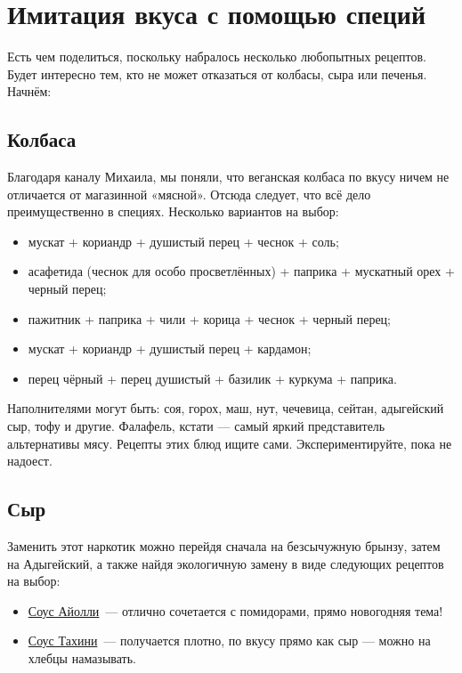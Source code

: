 \section{Имитация вкуса с помощью специй}

Есть чем поделиться, поскольку набралось несколько любопытных рецептов. Будет интересно тем, кто не может отказаться от колбасы, сыра или печенья. Начнём:

\subsection{Колбаса}

Благодаря каналу Михаила, мы поняли, что веганская колбаса по вкусу ничем не отличается от магазинной «мясной». Отсюда следует, что всё дело преимущественно в специях. Несколько вариантов на выбор:
\begin{itemize}
\item мускат + кориандр + душистый перец + чеснок + соль;
\item асафетида (чеснок для особо просветлённых) + паприка + мускатный орех + черный перец;
\item пажитник + паприка + чили + корица + чеснок + черный перец;
\item мускат + кориандр + душистый перец + кардамон;
\item перец чёрный + перец душистый + базилик + куркума + паприка.
\end{itemize}
Наполнителями могут быть: соя, горох, маш, нут, чечевица, сейтан, адыгейский сыр, тофу и другие. Фалафель, кстати — самый яркий представитель альтернативы мясу. Рецепты этих блюд ищите сами. Экспериментируйте, пока не надоест.  %

\subsection{Сыр}

Заменить этот наркотик можно перейдя сначала на безсычужную брынзу, затем на Адыгейский, а также найдя экологичную замену в виде следующих рецептов на выбор:
\begin{itemize}
    \item \hyperref[aiolli]{Соус Айолли}~---  отлично сочетается с помидорами, прямо новогодняя тема!

\item \hyperref[takini]{Соус Тахини}~--- получается плотно, по вкусу прямо как сыр — можно на хлебцы намазывать.
\end{itemize}


